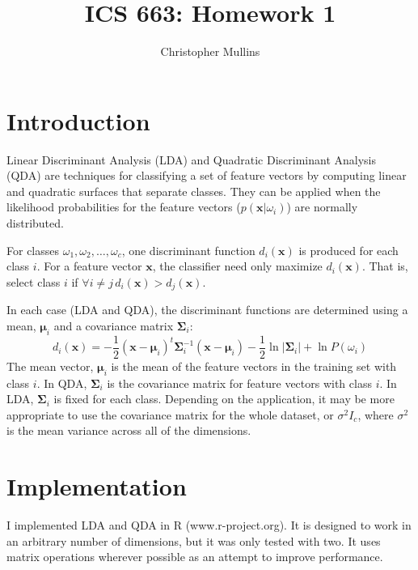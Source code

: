 \documentclass{article}
\begin{document}
\title{ICS 663: Homework 1}
\author{Christopher Mullins}
\maketitle

\noindent\hrulefill
\vspace{-5mm} %
\tableofcontents
\noindent\hrulefill

\section{Introduction}

Linear Discriminant Analysis (LDA) and Quadratic Discriminant Analysis (QDA) are techniques
for classifying a set of feature vectors by computing linear and quadratic surfaces that
separate classes. They can be applied when the likelihood probabilities for the feature
vectors ($p(\mathbf{x} | \omega_i)$) are normally distributed.

For classes $\omega_1, \omega_2, \dots, \omega_c$, one discriminant function $d_i(\mathbf{x})$
is produced for each class $i$. For a feature vector $\mathbf{x}$, the classifier need only
maximize $d_i(\mathbf{x})$. That is, select class $i$ if $\forall i\neq j \,d_i(\mathbf{x})
> d_j(\mathbf{x})$.

In each case (LDA and QDA), the discriminant functions are determined using a mean, $\mathbf{\mu}_i$
and a covariance matrix $\mathbf{\Sigma}_i$:
\[
	d_i(\mathbf{x}) = -\frac{1}{2}(\mathbf{x}-\mathbf{\mu}_i)^t \mathbf{\Sigma}_i^{-1} (\mathbf{x} - \mathbf{\mu}_i) -\frac{1}{2}\ln\left| \mathbf{\Sigma}_i \right| + \ln P(\omega_i)
\]
The mean vector, $\mathbf{\mu}_i$ is the mean of the feature vectors in the training set with
class $i$. In QDA, $\mathbf{\Sigma}_i$ is the covariance matrix for feature vectors with class $i$. In
LDA, $\mathbf{\Sigma}_i$ is fixed for each class. Depending on the application, it may be more appropriate
to use the covariance matrix for the whole dataset, or $\sigma^2 I_c$, where $\sigma^2$ is the
mean variance across all of the dimensions.

\section{Implementation}

I implemented LDA and QDA in R (www.r-project.org). It is designed to work in an arbitrary
number of dimensions, but it was only tested with two. It uses matrix operations wherever
possible as an attempt to improve performance.
\end{document}
